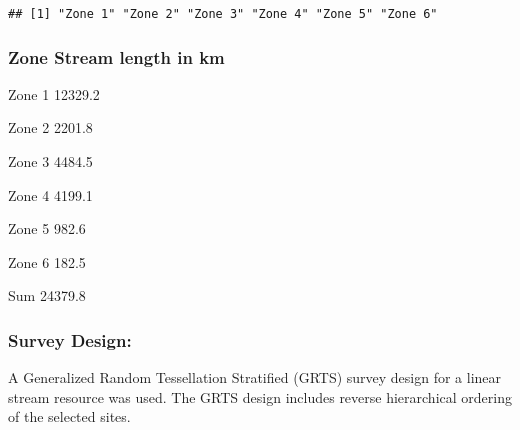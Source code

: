 \documentclass[
]{article}
\begin{document}
\begin{verbatim}
## [1] "Zone 1" "Zone 2" "Zone 3" "Zone 4" "Zone 5" "Zone 6"
\end{verbatim}

\hypertarget{zone-stream-length-in-km}{%
\subsubsection{Zone Stream length in
km}\label{zone-stream-length-in-km}}

Zone 1 12329.2

Zone 2 2201.8

Zone 3 4484.5

Zone 4 4199.1

Zone 5 982.6

Zone 6 182.5

Sum 24379.8

\hypertarget{survey-design}{%
\subsubsection{\texorpdfstring{\textbf{Survey
Design:}}{Survey Design:}}\label{survey-design}}

A Generalized Random Tessellation Stratified (GRTS) survey design for a
linear stream resource was used. The GRTS design includes reverse
hierarchical ordering of the selected sites.
\end{document}
